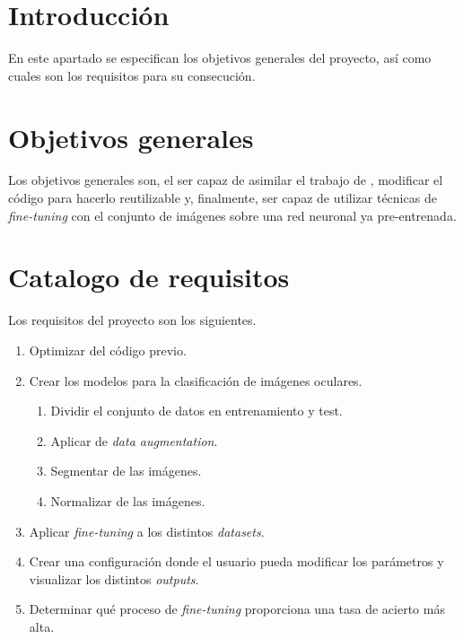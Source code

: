 
\section{Introducción}

En este apartado se especifican los objetivos generales del proyecto, así como cuales son los requisitos para su consecución.

\section{Objetivos generales}

Los objetivos generales son, el ser capaz de asimilar el trabajo de \cite{tfg_iris_2020}, modificar el código para hacerlo reutilizable y, finalmente, ser capaz de 
utilizar técnicas de \textit{fine-tuning} con el conjunto de imágenes sobre una red neuronal ya pre-entrenada.

\section{Catalogo de requisitos}

Los requisitos del proyecto son los siguientes.

\begin{enumerate}
    \item Optimizar del código previo.
    \item Crear los modelos para la clasificación de imágenes oculares.
        \begin{enumerate}
            \item Dividir el conjunto de datos en entrenamiento y test.
            \item Aplicar de \textit{data augmentation}.
            \item Segmentar de las imágenes.
            \item Normalizar de las imágenes.
        \end{enumerate}
    \item Aplicar \textit{fine-tuning} a los distintos \textit{datasets}.
    \item Crear una configuración donde el usuario pueda modificar los parámetros y visualizar los distintos \textit{outputs}.
    \item Determinar qué proceso de \textit{fine-tuning} proporciona una tasa de acierto más alta.
  \end{enumerate}


